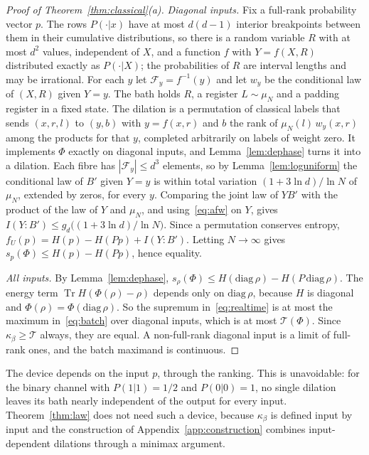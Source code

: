 \documentclass[11pt]{article}
\theoremstyle{definition}
\theoremstyle{remark}
\newcommand{\Tr}{\operatorname{Tr}}
\newcommand{\Tcap}{\mathcal T}
\newcommand{\Trt}{\kappa_\beta}
\begin{document}
\begin{proof}[Proof of Theorem~\ref{thm:classical}(a)]
\emph{Diagonal inputs.} Fix a full-rank probability vector $p$. The rows $P(\cdot|x)$ have at most $d(d-1)$ interior breakpoints between them in their cumulative distributions, so there is a random variable $R$ with at most $d^2$ values, independent of $X$, and a function $f$ with $Y=f(X,R)$ distributed exactly as $P(\cdot|X)$; the probabilities of $R$ are interval lengths and may be irrational. For each $y$ let $\mathcal F_y=f^{-1}(y)$ and let $w_y$ be the conditional law of $(X,R)$ given $Y=y$. The bath holds $R$, a register $L\sim\mu_N$ and a padding register in a fixed state. The dilation is a permutation of classical labels that sends $(x,r,l)$ to $(y,b)$ with $y=f(x,r)$ and $b$ the rank of $\mu_N(l)\,w_y(x,r)$ among the products for that $y$, completed arbitrarily on labels of weight zero. It implements $\Phi$ exactly on diagonal inputs, and Lemma~\ref{lem:dephase} turns it into a dilation. Each fibre has $|\mathcal F_y|\le d^3$ elements, so by Lemma~\ref{lem:loguniform} the conditional law of $B'$ given $Y=y$ is within total variation $(1+3\ln d)/\ln N$ of $\mu_N$, extended by zeros, for every $y$. Comparing the joint law of $YB'$ with the product of the law of $Y$ and $\mu_N$, and using~\eqref{eq:afw} on $Y$, gives $I(Y{:}B')\le g_d\bigl((1+3\ln d)/\ln N\bigr)$. Since a permutation conserves entropy, $f_U(p)=H(p)-H(Pp)+I(Y{:}B')$. Letting $N\to\infty$ gives $s_p(\Phi)\le H(p)-H(Pp)$, hence equality.

\emph{All inputs.} By Lemma~\ref{lem:dephase}, $s_\rho(\Phi)\le H(\mathrm{diag}\,\rho)-H(P\,\mathrm{diag}\,\rho)$. The energy term $\Tr H(\Phi(\rho)-\rho)$ depends only on $\mathrm{diag}\,\rho$, because $H$ is diagonal and $\Phi(\rho)=\Phi(\mathrm{diag}\,\rho)$. So the supremum in~\eqref{eq:realtime} is at most the maximum in~\eqref{eq:batch} over diagonal inputs, which is at most $\Tcap(\Phi)$. Since $\Trt\ge\Tcap$ always, they are equal. A non-full-rank diagonal input is a limit of full-rank ones, and the batch maximand is continuous.
\end{proof}

The device depends on the input $p$, through the ranking. This is unavoidable: for the binary channel with $P(1|1)=1/2$ and $P(0|0)=1$, no single dilation leaves its bath nearly independent of the output for every input. Theorem~\ref{thm:law} does not need such a device, because $\Trt$ is defined input by input and the construction of Appendix~\ref{app:construction} combines input-dependent dilations through a minimax argument.
\end{document}
